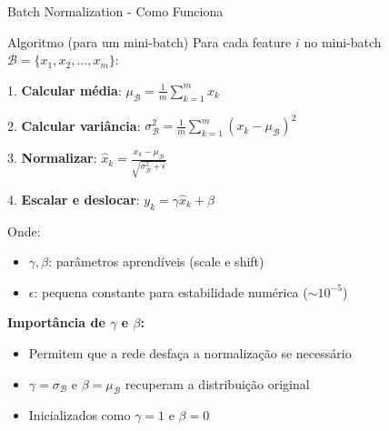 \documentclass{beamer}
\begin{document}
\begin{frame}{Batch Normalization - Como Funciona}
\begin{block}{Algoritmo (para um mini-batch)}
Para cada feature $i$ no mini-batch $\mathcal{B} = \{x_1, x_2, ..., x_m\}$:

\vspace{0.3cm}
1. \textbf{Calcular média}: $\mu_{\mathcal{B}} = \frac{1}{m}\sum_{k=1}^{m} x_k$

2. \textbf{Calcular variância}: $\sigma^2_{\mathcal{B}} = \frac{1}{m}\sum_{k=1}^{m} (x_k - \mu_{\mathcal{B}})^2$

3. \textbf{Normalizar}: $\hat{x}_k = \frac{x_k - \mu_{\mathcal{B}}}{\sqrt{\sigma^2_{\mathcal{B}} + \epsilon}}$

4. \textbf{Escalar e deslocar}: $y_k = \gamma \hat{x}_k + \beta$
\end{block}

\vspace{0.3cm}
Onde:
\begin{itemize}
    \item $\gamma, \beta$: parâmetros aprendíveis (scale e shift)
    \item $\epsilon$: pequena constante para estabilidade numérica ($\sim 10^{-5}$)
\end{itemize}

\vspace{0.3cm}
\textbf{Importância de $\gamma$ e $\beta$:}
\begin{itemize}
    \item Permitem que a rede desfaça a normalização se necessário
    \item $\gamma = \sigma_{\mathcal{B}}$ e $\beta = \mu_{\mathcal{B}}$ recuperam a distribuição original
    \item Inicializados como $\gamma = 1$ e $\beta = 0$
\end{itemize}
\end{frame}
\end{document}
